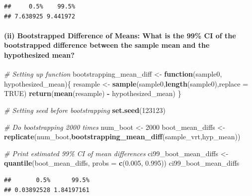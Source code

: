 \documentclass[
]{article}
\newenvironment{Shaded}{\begin{snugshade}}{\end{snugshade}}
\newcommand{\AttributeTok}[1]{\textcolor[rgb]{0.13,0.29,0.53}{#1}}
\newcommand{\CommentTok}[1]{\textcolor[rgb]{0.56,0.35,0.01}{\textit{#1}}}
\newcommand{\ConstantTok}[1]{\textcolor[rgb]{0.56,0.35,0.01}{#1}}
\newcommand{\ControlFlowTok}[1]{\textcolor[rgb]{0.13,0.29,0.53}{\textbf{#1}}}
\newcommand{\DecValTok}[1]{\textcolor[rgb]{0.00,0.00,0.81}{#1}}
\newcommand{\FloatTok}[1]{\textcolor[rgb]{0.00,0.00,0.81}{#1}}
\newcommand{\FunctionTok}[1]{\textcolor[rgb]{0.13,0.29,0.53}{\textbf{#1}}}
\newcommand{\NormalTok}[1]{#1}
\newcommand{\OtherTok}[1]{\textcolor[rgb]{0.56,0.35,0.01}{#1}}
\newcommand{\SpecialCharTok}[1]{\textcolor[rgb]{0.81,0.36,0.00}{\textbf{#1}}}
\begin{document}
\begin{verbatim}
##     0.5%    99.5% 
## 7.638925 9.441972
\end{verbatim}

\hypertarget{ii-bootstrapped-difference-of-means-what-is-the-99-ci-of-the-bootstrapped-difference-between-the-sample-mean-and-the-hypothesized-mean}{%
\paragraph{(ii) Bootstrapped Difference of Means: What is the 99\% CI of
the bootstrapped difference between the sample mean and the hypothesized
mean?}\label{ii-bootstrapped-difference-of-means-what-is-the-99-ci-of-the-bootstrapped-difference-between-the-sample-mean-and-the-hypothesized-mean}}

\begin{Shaded}
\begin{Highlighting}[]
\CommentTok{\# Setting up function}
\NormalTok{bootstrapping\_mean\_diff }\OtherTok{\textless{}{-}} \ControlFlowTok{function}\NormalTok{(sample0, hypothesized\_mean)\{}
\NormalTok{  resample }\OtherTok{\textless{}{-}} \FunctionTok{sample}\NormalTok{(sample0,}\FunctionTok{length}\NormalTok{(sample0),}\AttributeTok{replace =} \ConstantTok{TRUE}\NormalTok{)}
  \FunctionTok{return}\NormalTok{(}\FunctionTok{mean}\NormalTok{(resample) }\SpecialCharTok{{-}}\NormalTok{ hypothesized\_mean)}
\NormalTok{\}}

\CommentTok{\# Setting seed before bootstrapping}
\FunctionTok{set.seed}\NormalTok{(}\DecValTok{123123}\NormalTok{)}

\CommentTok{\# Do bootstrapping 2000 times}
\NormalTok{num\_boot }\OtherTok{\textless{}{-}} \DecValTok{2000}
\NormalTok{boot\_mean\_diffs }\OtherTok{\textless{}{-}} \FunctionTok{replicate}\NormalTok{(num\_boot,}\FunctionTok{bootstrapping\_mean\_diff}\NormalTok{(sample\_vrt,hyp\_mean))}

\CommentTok{\# Print estimated 99\% CI of mean differences}
\NormalTok{ci99\_boot\_mean\_diffs }\OtherTok{\textless{}{-}} \FunctionTok{quantile}\NormalTok{(boot\_mean\_diffs, }\AttributeTok{probs =} \FunctionTok{c}\NormalTok{(}\FloatTok{0.005}\NormalTok{, }\FloatTok{0.995}\NormalTok{))}
\NormalTok{ci99\_boot\_mean\_diffs}
\end{Highlighting}
\end{Shaded}

\begin{verbatim}
##       0.5%      99.5% 
## 0.03892528 1.84197161
\end{verbatim}
\end{document}
